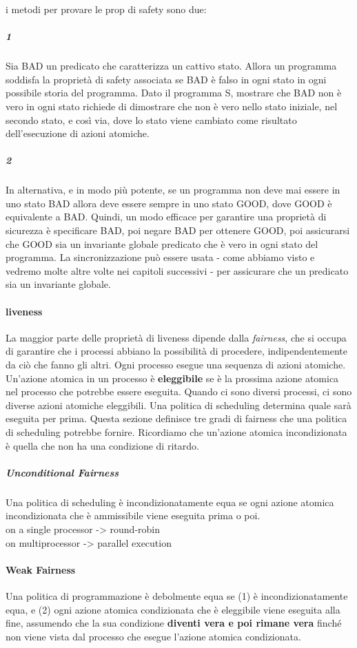 \documentclass[10pt,a4paper]{article}
\begin{document}
i metodi per provare le prop di safety sono due:
\subparagraph{1} Sia BAD un predicato che caratterizza un cattivo stato. Allora un programma soddisfa la proprietà di safety associata se BAD è falso in ogni stato in ogni possibile storia del programma. Dato il programma S, mostrare che BAD non è vero in ogni stato richiede di dimostrare che non è vero nello
stato iniziale, nel secondo stato, e così via, dove lo stato viene cambiato come risultato dell'esecuzione di azioni atomiche.
\subparagraph{2} In alternativa, e in modo più potente, se un programma non deve mai essere in uno stato BAD allora deve essere sempre in uno stato GOOD, dove GOOD è equivalente a BAD. Quindi, un modo efficace per garantire una proprietà di sicurezza è specificare BAD, poi negare BAD per ottenere GOOD, poi assicurarsi che GOOD sia un invariante globale predicato che è vero in ogni stato del programma. La sincronizzazione può essere usata - come abbiamo visto e vedremo molte altre volte nei capitoli successivi - per assicurare che un predicato sia un invariante globale.

\paragraph{liveness}
La maggior parte delle proprietà di liveness dipende dalla \textit{fairness}, che si occupa di garantire che i processi abbiano la possibilità di procedere, indipendentemente da ciò che fanno gli altri. Ogni processo esegue una sequenza di azioni atomiche. Un'azione atomica in un processo è \textbf{eleggibile} se è la prossima azione atomica nel processo che potrebbe essere eseguita.
Quando ci sono diversi processi, ci sono diverse azioni atomiche eleggibili. Una politica di scheduling determina quale sarà eseguita per prima. Questa sezione definisce tre gradi di fairness che una politica di scheduling potrebbe fornire.
Ricordiamo che un'azione atomica incondizionata è quella che non ha una condizione di ritardo.

\subparagraph{Unconditional Fairness} Una politica di scheduling è incondizionatamente equa se
ogni azione atomica incondizionata che è ammissibile viene eseguita prima o poi.\\
on a single processor -> round-robin\\
on multiprocessor -> parallel execution

\paragraph{Weak Fairness} Una politica di programmazione è debolmente equa se (1) è incondizionatamente equa, e (2) ogni azione atomica condizionata che è eleggibile viene eseguita alla fine, assumendo che la sua condizione \textbf{diventi vera e poi rimane vera} finché non viene vista dal processo che esegue l'azione atomica condizionata.
\end{document}
